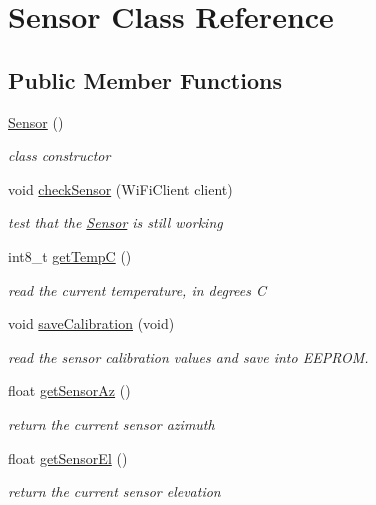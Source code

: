 \hypertarget{class_sensor}{}\section{Sensor Class Reference}
\label{class_sensor}
\subsection*{Public Member Functions}
\begin{DoxyCompactItemize}
\item 
\mbox{\label{class_sensor_a342d6d11ef572c8cba92cb76fb1a294b}} 
\hyperlink{class_sensor_a342d6d11ef572c8cba92cb76fb1a294b}{Sensor} ()
\begin{DoxyCompactList}\small\item\em class constructor \end{DoxyCompactList}\item 
void \hyperlink{class_sensor_a7deffa1efa1d54a560b6bf808e3fe9c8}{check\+Sensor} (Wi\+Fi\+Client client)
\begin{DoxyCompactList}\small\item\em test that the \hyperlink{class_sensor}{Sensor} is still working \end{DoxyCompactList}\item 
int8\+\_\+t \hyperlink{class_sensor_a8a27b409dbfc1f335cc8f05cce30e7ec}{get\+TempC} ()
\begin{DoxyCompactList}\small\item\em read the current temperature, in degrees C \end{DoxyCompactList}\item 
void \hyperlink{class_sensor_a106849dcbe07faca4c96547f1278ad72}{save\+Calibration} (void)
\begin{DoxyCompactList}\small\item\em read the sensor calibration values and save into E\+E\+P\+R\+OM. \end{DoxyCompactList}\item 
float \hyperlink{class_sensor_a12bb1d7269370d6f8571759fd08d285f}{get\+Sensor\+Az} ()
\begin{DoxyCompactList}\small\item\em return the current sensor azimuth \end{DoxyCompactList}\item 
float \hyperlink{class_sensor_a6fd128ef38ef96c21c0b35d95ab68cef}{get\+Sensor\+El} ()
\begin{DoxyCompactList}\small\item\em return the current sensor elevation \end{DoxyCompactList}\item 

\end{DoxyCompactItemize}

